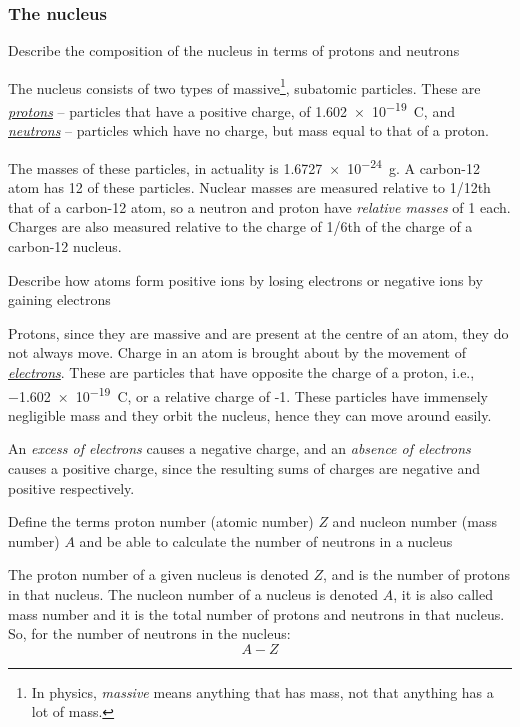 \subsubsection{The nucleus}
\begin{subpoint}
Describe the composition of the nucleus in terms of protons and neutrons
\end{subpoint}

The nucleus consists of two types of massive\footnote{In physics, \emph{massive} means anything
that has mass, not that anything has a lot of mass.}, subatomic particles. These are
\emph{\ul{protons}} -- particles that have a positive charge, of \SI{1.602e-19}{C},
and \emph{\ul{neutrons}} -- particles which have no charge, but mass equal to that of
a proton.

The masses of these particles, in actuality is \SI{1.6727e-24}{g}. A carbon-12 atom has
12 of these particles. Nuclear masses are measured relative to 1/12th that of a 
carbon-12 atom, so a neutron and proton have \emph{relative masses} of 1 each. Charges
are also measured relative to the charge of 1/6th of the charge of a carbon-12 nucleus.
\newpage

\begin{subpoint}
Describe how atoms form positive ions by losing electrons or negative ions by gaining electrons
\end{subpoint}

Protons, since they are massive and are present at the centre of an atom, they do not
always move. Charge in an atom is brought about by the movement of 
\emph{\ul{electrons}}. These are particles that have opposite the charge of a proton,
i.e., \SI{-1.602e-19}{C}, or a relative charge of -1. These particles have immensely
negligible mass and they orbit the nucleus, hence they can move around easily.

An \emph{excess of electrons} causes a negative charge, and an 
\emph{absence of electrons} causes a positive charge, since the resulting sums of
charges are negative and positive respectively.

\begin{subpoint}
Define the terms proton number (atomic number) $Z$ and nucleon number (mass number) $A$ and be able to
calculate the number of neutrons in a nucleus
\end{subpoint}

The proton number of a given nucleus is denoted $Z$, and is the number of protons in
that nucleus. The nucleon number of a nucleus is denoted $A$, it is also called mass
number and it is the total number of protons and neutrons in that nucleus. So, for
the number of neutrons in the nucleus:
$$ A - Z $$

